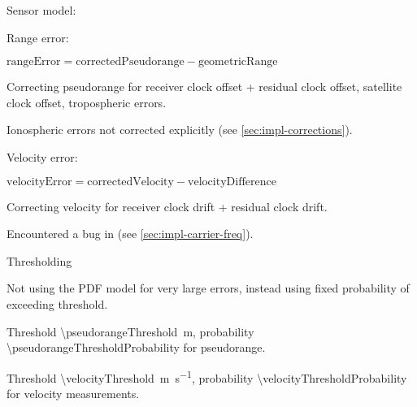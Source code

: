 \begin{compactitem}
\begin{compactitem}
    \item
    Sensor model:
    \begin{compactitem}
        \item Range error:
        \begin{compactitem}
            \item \(\mathrm{rangeError} = \mathrm{correctedPseudorange} - \mathrm{geometricRange}\)
            \item Correcting pseudorange for
                receiver clock offset + residual clock offset,
                satellite clock offset,
                tropospheric errors.
            \item Ionospheric errors not corrected explicitly (see \cref{sec:impl-corrections}).
        \end{compactitem}
        \item Velocity error:
        \begin{compactitem}
            \item \(\mathrm{velocityError} = \mathrm{correctedVelocity} - \mathrm{velocityDifference}\)
            \item Correcting velocity for receiver clock drift + residual clock drift.
            \item Encountered a bug in \sirf (see \cref{sec:impl-carrier-freq}).
        \end{compactitem}
        \item Thresholding
        \begin{compactitem}
            \item Not using the PDF model for very large errors, instead using
                  fixed probability of exceeding threshold.
            \item Threshold \SI{\pseudorangeThreshold}{\meter}, probability \num{\pseudorangeThresholdProbability} for pseudorange.
            \item Threshold \SI{\velocityThreshold}{\meter\per\second}, probability \num{\velocityThresholdProbability} for velocity measurements.
        \end{compactitem}


\end{compactitem}
\end{compactitem}
\end{compactitem}
